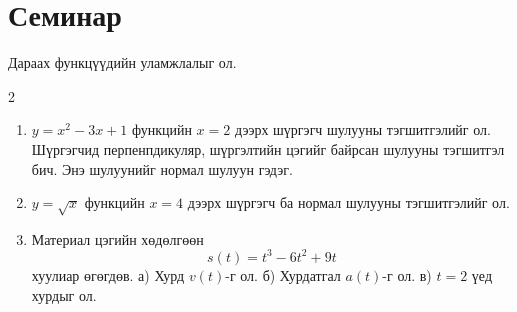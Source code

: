 \section{Семинар}
Дараах функцүүдийн уламжлалыг ол.
\begin{multicols}{2}
\begin{enumerate}
  \item $y=x^2-3x+1$ функцийн $x=2$ дээрх шүргэгч шулууны тэгшитгэлийг ол. Шүргэгчид перпенпдикуляр, шүргэлтийн цэгийг байрсан шулууны тэгшитгэл бич. Энэ шулуунийг нормал шулуун гэдэг.
 \item $y=\sqrt{x}$ функцийн $x=4$ дээрх шүргэгч ба нормал шулууны тэгшитгэлийг ол.
 \item Материал цэгийн хөдөлгөөн
\[
s(t)=t^3-6t^2+9t
\]
хуулиар өгөгдөв.  
а) Хурд $v(t)$-г ол.  
б) Хурдатгал $a(t)$-г ол.  
в) $t=2$ үед хурдыг ол.


\end{enumerate}
\end{multicols}
